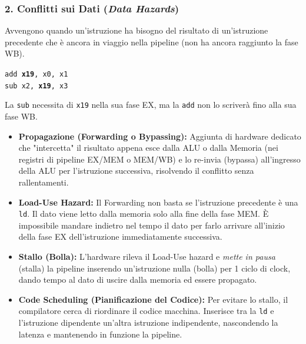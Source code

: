 \documentclass[12pt, a4paper]{article}
\begin{document}
\subsubsection{2. Conflitti sui Dati (\textit{Data Hazards})}
Avvengono quando un'istruzione ha bisogno del risultato di un'istruzione precedente che è ancora in viaggio nella pipeline (non ha ancora raggiunto la fase WB).
\begin{center}
    \texttt{add \textbf{x19}, x0, x1} \\
    \texttt{sub x2, \textbf{x19}, x3}
\end{center}
La \texttt{sub} necessita di \texttt{x19} nella sua fase EX, ma la \texttt{add} non lo scriverà fino alla sua fase WB.
\begin{itemize}
    \item \textbf{Propagazione (Forwarding o Bypassing):} Aggiunta di hardware dedicato che "intercetta" il risultato appena esce dalla ALU o dalla Memoria (nei registri di pipeline EX/MEM o MEM/WB) e lo re-invia (bypassa) all'ingresso della ALU per l'istruzione successiva, risolvendo il conflitto senza rallentamenti.
    \item \textbf{Load-Use Hazard:} Il Forwarding non basta se l'istruzione precedente è una \texttt{ld}. Il dato viene letto dalla memoria solo alla fine della fase MEM. È impossibile mandare indietro nel tempo il dato per farlo arrivare all'inizio della fase EX dell'istruzione immediatamente successiva.
    \item \textbf{Stallo (Bolla):} L'hardware rileva il Load-Use hazard e \textit{mette in pausa} (stalla) la pipeline inserendo un'istruzione nulla (bolla) per 1 ciclo di clock, dando tempo al dato di uscire dalla memoria ed essere propagato.
    \item \textbf{Code Scheduling (Pianificazione del Codice):} Per evitare lo stallo, il compilatore cerca di riordinare il codice macchina. Inserisce tra la \texttt{ld} e l'istruzione dipendente un'altra istruzione indipendente, nascondendo la latenza e mantenendo in funzione la pipeline.
\end{itemize}
\end{document}
